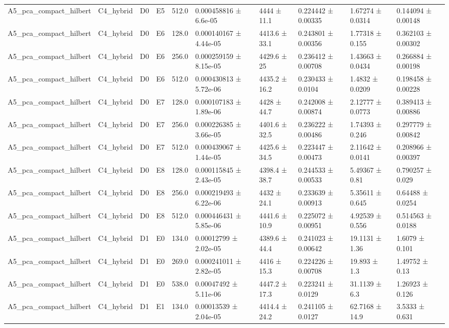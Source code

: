 \begin{table}
\begin{tabular}{llllllllll}
A5\_pca\_compact\_hilbert & C4\_hybrid & D0 & E5 & 512.0 & 0.000458816 ± 6.6e-05 & 4444 ± 11.1 & 0.224442 ± 0.00335 & 1.67274 ± 0.0314 & 0.144094 ± 0.00148 \\
A5\_pca\_compact\_hilbert & C4\_hybrid & D0 & E6 & 128.0 & 0.000140167 ± 4.44e-05 & 4413.6 ± 33.1 & 0.243801 ± 0.00356 & 1.77318 ± 0.155 & 0.362103 ± 0.00302 \\
A5\_pca\_compact\_hilbert & C4\_hybrid & D0 & E6 & 256.0 & 0.000259159 ± 8.15e-05 & 4429.6 ± 25 & 0.236412 ± 0.00708 & 1.43663 ± 0.0434 & 0.266884 ± 0.00198 \\
A5\_pca\_compact\_hilbert & C4\_hybrid & D0 & E6 & 512.0 & 0.000430813 ± 5.72e-06 & 4435.2 ± 16.2 & 0.230433 ± 0.0104 & 1.4832 ± 0.0209 & 0.198458 ± 0.00228 \\
A5\_pca\_compact\_hilbert & C4\_hybrid & D0 & E7 & 128.0 & 0.000107183 ± 1.89e-06 & 4428 ± 44.7 & 0.242008 ± 0.00874 & 2.12777 ± 0.0773 & 0.389413 ± 0.00886 \\
A5\_pca\_compact\_hilbert & C4\_hybrid & D0 & E7 & 256.0 & 0.000226385 ± 3.66e-05 & 4401.6 ± 32.5 & 0.236222 ± 0.00486 & 1.74393 ± 0.246 & 0.297779 ± 0.00842 \\
A5\_pca\_compact\_hilbert & C4\_hybrid & D0 & E7 & 512.0 & 0.000439067 ± 1.44e-05 & 4425.6 ± 34.5 & 0.223447 ± 0.00473 & 2.11642 ± 0.0141 & 0.208966 ± 0.00397 \\
A5\_pca\_compact\_hilbert & C4\_hybrid & D0 & E8 & 128.0 & 0.000115845 ± 2.43e-05 & 4398.4 ± 38.7 & 0.244533 ± 0.00533 & 5.49367 ± 0.81 & 0.790257 ± 0.029 \\
A5\_pca\_compact\_hilbert & C4\_hybrid & D0 & E8 & 256.0 & 0.000219493 ± 6.22e-06 & 4432 ± 24.1 & 0.233639 ± 0.00913 & 5.35611 ± 0.645 & 0.64488 ± 0.0254 \\
A5\_pca\_compact\_hilbert & C4\_hybrid & D0 & E8 & 512.0 & 0.000446431 ± 5.85e-06 & 4441.6 ± 10.9 & 0.225072 ± 0.00951 & 4.92539 ± 0.556 & 0.514563 ± 0.0188 \\
A5\_pca\_compact\_hilbert & C4\_hybrid & D1 & E0 & 134.0 & 0.00012799 ± 2.02e-05 & 4389.6 ± 44.4 & 0.241023 ± 0.00642 & 19.1131 ± 1.36 & 1.6079 ± 0.101 \\
A5\_pca\_compact\_hilbert & C4\_hybrid & D1 & E0 & 269.0 & 0.000241011 ± 2.82e-05 & 4416 ± 15.3 & 0.224226 ± 0.00708 & 19.893 ± 1.3 & 1.49752 ± 0.13 \\
A5\_pca\_compact\_hilbert & C4\_hybrid & D1 & E0 & 538.0 & 0.00047492 ± 5.11e-06 & 4447.2 ± 17.3 & 0.223241 ± 0.0129 & 31.1139 ± 6.3 & 1.26923 ± 0.126 \\
A5\_pca\_compact\_hilbert & C4\_hybrid & D1 & E1 & 134.0 & 0.00013539 ± 2.04e-05 & 4414.4 ± 24.2 & 0.241105 ± 0.0127 & 62.7168 ± 14.9 & 3.5333 ± 0.631 \\

\end{tabular}
\end{table}
